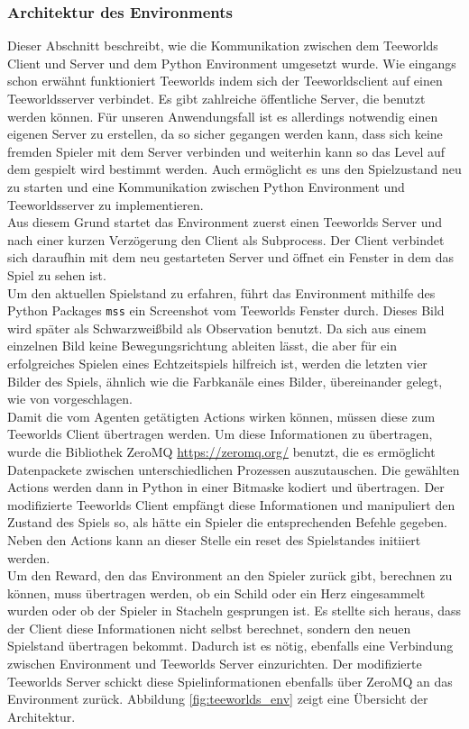 \documentclass[11pt]{scrartcl}
\begin{document}
\subsubsection{Architektur des Environments}
Dieser Abschnitt beschreibt, wie die Kommunikation zwischen dem Teeworlds Client und
Server und dem Python Environment umgesetzt wurde. Wie eingangs schon erwähnt funktioniert
Teeworlds indem sich der Teeworldsclient auf einen Teeworldsserver verbindet. Es gibt
zahlreiche öffentliche Server, die benutzt werden können. Für unseren Anwendungsfall ist
es allerdings notwendig einen eigenen Server zu erstellen, da so sicher gegangen werden
kann, dass sich keine fremden Spieler mit dem Server verbinden und weiterhin kann so das
Level auf dem gespielt wird bestimmt werden. Auch ermöglicht es uns den Spielzustand neu
zu starten und eine Kommunikation zwischen Python Environment und Teeworldsserver zu
implementieren.\\
Aus diesem Grund startet das Environment zuerst einen Teeworlds Server und nach einer
kurzen Verzögerung den Client als Subprocess. Der Client verbindet sich daraufhin mit dem
neu gestarteten Server und öffnet ein Fenster in dem das Spiel zu sehen ist.\\
Um den aktuellen Spielstand zu erfahren, führt das Environment mithilfe des Python
Packages \lstinline!mss! ein Screenshot vom Teeworlds Fenster durch. Dieses Bild wird
später als Schwarzweißbild als Observation benutzt. Da sich aus einem einzelnen Bild
keine Bewegungsrichtung ableiten lässt, die aber für ein erfolgreiches Spielen eines
Echtzeitspiels hilfreich ist, werden die letzten vier Bilder des Spiels, ähnlich wie die
Farbkanäle eines Bilder, übereinander gelegt, wie von \cite[~S.206]{L2018}
vorgeschlagen.\\
Damit die vom Agenten getätigten Actions wirken können, müssen diese zum Teeworlds Client
übertragen werden. Um diese Informationen zu übertragen, wurde die Bibliothek ZeroMQ
\url{https://zeromq.org/} benutzt, die es ermöglicht Datenpackete zwischen
unterschiedlichen Prozessen auszutauschen. Die gewählten Actions werden dann in Python
in einer Bitmaske kodiert und übertragen. Der modifizierte Teeworlds Client empfängt diese
Informationen und manipuliert den Zustand des Spiels so, als hätte ein Spieler die
entsprechenden Befehle gegeben. Neben den Actions kann an dieser Stelle ein reset des
Spielstandes initiiert werden.\\
Um den Reward, den das Environment an den Spieler zurück gibt, berechnen zu können, muss
übertragen werden, ob ein Schild oder ein Herz eingesammelt wurden oder ob der Spieler in
Stacheln gesprungen ist. Es stellte sich heraus, dass der Client diese Informationen nicht
selbst berechnet, sondern den neuen Spielstand übertragen bekommt. Dadurch ist es nötig,
ebenfalls eine Verbindung zwischen Environment und Teeworlds Server einzurichten. Der
modifizierte Teeworlds Server schickt diese Spielinformationen ebenfalls über ZeroMQ an
das Environment zurück. Abbildung \ref{fig:teeworlds_env} zeigt eine Übersicht der
Architektur.
\end{document}
